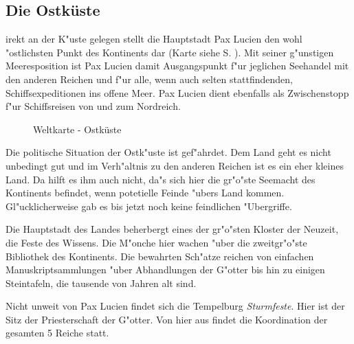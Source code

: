 \subsection{Die Ostküste}
irekt an der K"uste
gelegen stellt die Hauptstadt Pax Lucien den
wohl "ostlichsten Punkt des Kontinents dar (Karte siehe S.
\pageref{fig_map_east}). Mit seiner g"unstigen Meeresposition ist
Pax Lucien damit Ausgangspunkt f"ur jeglichen Seehandel mit den
anderen Reichen und f"ur alle, wenn auch selten stattfindenden,
Schiffsexpeditionen ins offene Meer. Pax Lucien dient ebenfalls als
Zwischenstopp f"ur Schiffsreisen von und zum Nordreich.

\begin{figure}[hbtp]
\begin{center}
\end{center}
\caption{Weltkarte - Ostküste} \label{fig_map_east}
\end{figure}

\par Die politische
Situation der Ostk"uste ist gef"ahrdet. Dem Land geht es nicht
unbedingt gut und im Verh"altnis zu den anderen Reichen ist es ein
eher kleines Land. Da hilft es ihm auch nicht, da"s sich hier die
gr"o"ste Seemacht des Kontinents befindet, wenn potetielle Feinde
"ubers Land kommen. Gl"ucklicherweise gab es bis jetzt noch keine
feindlichen "Ubergriffe.

\par Die Hauptstadt des Landes beherbergt eines der gr"o"sten Kloster
der Neuzeit, die \glqq Feste des Wissens\grqq{}. Die M"onche hier
wachen "uber die zweitgr"o"ste Bibliothek des Kontinents. Die
bewahrten Sch"atze reichen von einfachen Manuskriptsammlungen "uber
Abhandlungen der G"otter bis hin zu einigen Steintafeln, die
tausende von Jahren alt sind.

\par Nicht unweit von Pax Lucien findet sich die Tempelburg \textit{Sturmfeste}.
Hier ist der Sitz der Priesterschaft der G"otter. Von hier aus
findet die Koordination der gesamten 5 Reiche statt.

